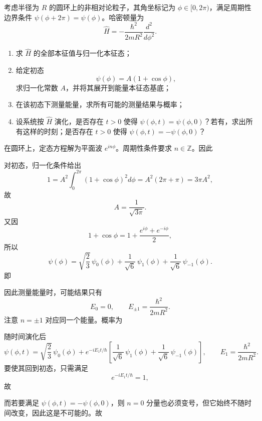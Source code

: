 ﻿

\begin{question}
考虑半径为 $R$ 的圆环上的非相对论粒子，其角坐标记为 $\phi\in[0,2\pi)$，满足周期性边界条件 $\psi(\phi+2\pi)=\psi(\phi)$。哈密顿量为
\[
\hat H=-\frac{\hbar^2}{2mR^2}\frac{d^2}{d\phi^2}.
\]

\begin{enumerate}[label=(\arabic*),leftmargin=2.5em]
  \item 求 $\hat H$ 的全部本征值与归一化本征态；
  \item 给定初态
  \[
  \psi(\phi)=A(1+\cos\phi),
  \]
  求归一化常数 $A$，并将其展开到能量本征态基底；
  \item 在该初态下测量能量，求所有可能的测量结果与概率；
  \item 设系统按 $\hat H$ 演化，是否存在 $t>0$ 使得 $\psi(\phi,t)=\psi(\phi,0)$？若有，求出所有这样的时刻；是否存在 $t>0$ 使得 $\psi(\phi,t)=-\psi(\phi,0)$？
\end{enumerate}

\begin{solution}
在圆环上，定态方程解为平面波 $e^{in\phi}$。周期性条件要求 $n\in\mathbb Z$。因此

对初态，归一化条件给出
\[
1=A^2\int_0^{2\pi}(1+\cos\phi)^2d\phi=A^2(2\pi+\pi)=3\pi A^2,
\]
故
\[
A=\frac{1}{\sqrt{3\pi}}.
\]
又因
\[
1+\cos\phi=1+\frac{e^{i\phi}+e^{-i\phi}}{2},
\]
所以
\[
\psi(\phi)=\sqrt{\frac{2}{3}}\,\psi_0(\phi)+\frac{1}{\sqrt6}\,\psi_1(\phi)+\frac{1}{\sqrt6}\,\psi_{-1}(\phi).
\]
即

因此测量能量时，可能结果只有
\[
E_0=0,
\qquad
E_{\pm1}=\frac{\hbar^2}{2mR^2}.
\]
注意 $n=\pm1$ 对应同一个能量。概率为

随时间演化后
\[
\psi(\phi,t)=\sqrt{\frac23}\,\psi_0(\phi)+e^{-iE_1t/\hbar}\left[\frac{1}{\sqrt6}\,\psi_1(\phi)+\frac{1}{\sqrt6}\,\psi_{-1}(\phi)\right],
\qquad E_1=\frac{\hbar^2}{2mR^2}.
\]
要使其回到初态，只需满足
\[
e^{-iE_1 t/\hbar}=1,
\]
故

而若要满足 $\psi(\phi,t)=-\psi(\phi,0)$，则 $n=0$ 分量也必须变号，但它始终不随时间改变，因此这是不可能的。故
\end{solution}
\end{question}


